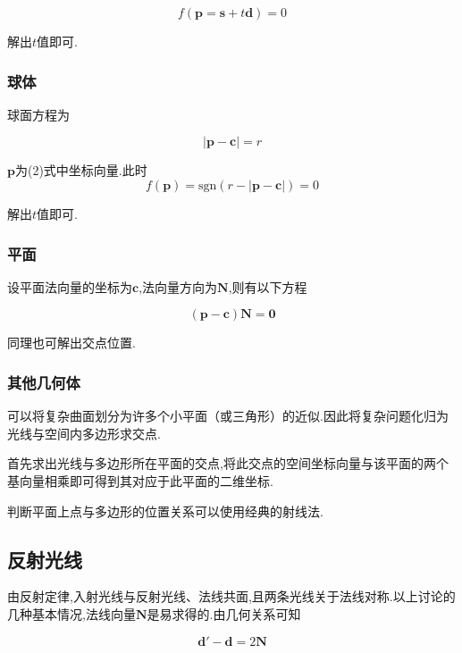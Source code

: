 \documentclass[10pt,twocolumn]{article}
\newcommand{\sgn}{\text{sgn}}
\begin{document}
\begin{equation}f(\mathbf{p}=\mathbf{s}+t\mathbf{d})=0\end{equation}

解出$t$值即可.

\subsubsection{\hei 球体}

球面方程为

\begin{equation}
|\mathbf{p}-\mathbf{c}|=r
\end{equation}

$\mathbf{p}$为(2)式中坐标向量.此时$$f(\mathbf{p})=\sgn(r-|\mathbf{p}-\mathbf{c}|)=0$$

解出$t$值即可.

\subsubsection{\hei 平面}

设平面法向量的坐标为$\mathbf{c}$,法向量方向为$\mathbf{N}$,则有以下方程

\begin{equation}
(\mathbf{p}-\mathbf{c})\mathbf{N}=\mathbf{0}
\end{equation}

同理也可解出交点位置.

\subsubsection{\hei 其他几何体}
可以将复杂曲面划分为许多个小平面（或三角形）的近似.因此将复杂问题化归为光线与空间内多边形求交点.

首先求出光线与多边形所在平面的交点,将此交点的空间坐标向量与该平面的两个基向量相乘即可得到其对应于此平面的二维坐标.

判断平面上点与多边形的位置关系可以使用经典的射线法.

\subsection{\hei 反射光线}
由反射定律,入射光线与反射光线、法线共面,且两条光线关于法线对称.以上讨论的几种基本情况,法线向量$\mathbf{N}$是易求得的.由几何关系可知

\begin{equation}
\mathbf{d'}-\mathbf{d}=2\mathbf{N}
\end{equation}
\end{document}
